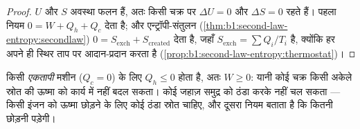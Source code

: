 \begin{proof}
$U$ और $S$ अवस्था फलन हैं, अतः किसी चक्र पर $\Delta U = 0$ और $\Delta S = 0$
रहते हैं। पहला नियम $0 = W + Q_h + Q_c$ देता है; और एन्ट्रॉपी-संतुलन
(\cref{thm:b1:second-law-entropy:secondlaw}) $0 = S_{\mathrm{exch}} +
S_{\mathrm{created}}$ देता है, जहाँ $S_{\mathrm{exch}} = \sum Q_i/T_i$ है,
क्योंकि हर  अपने ही स्थिर ताप पर आदान-प्रदान करता है
(\cref{prop:b1:second-law-entropy:thermostat})।
\end{proof}

\begin{corollary}[केल्विन, फिर से]\label{cor:b1:heat-engines:kelvin}
किसी \emph{एकतापी} मशीन ($Q_c = 0$) के लिए $Q_h \leq 0$ होता है, अतः
$W \geq 0$: यानी कोई चक्र किसी अकेले स्रोत की ऊष्मा को कार्य में नहीं बदल
सकता। कोई जहाज़ समुद्र को ठंडा करके नहीं चल सकता --- किसी इंजन को ऊष्मा
छोड़ने के लिए कोई ठंडा स्रोत चाहिए, और दूसरा नियम बताता है कि कितनी छोड़नी
पड़ेगी।
\end{corollary}

